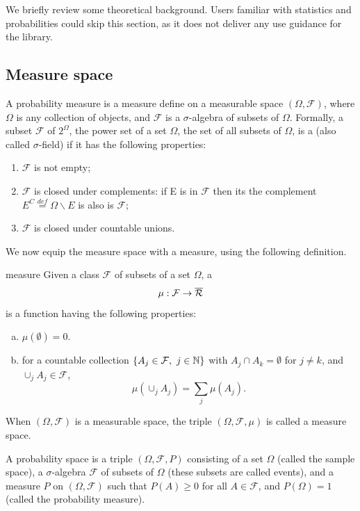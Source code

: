 We briefly review some theoretical background.
Users familiar with statistics and probabilities could skip this section, as it does not deliver any use guidance for the library.

\subsection{Measure space}

A probability measure is a measure define on a measurable space $(\Omega, \mathcal{F})$,
where $\Omega$ is any collection of objects, and $\mathcal{F}$ is a $\sigma$-algebra of subsets of $\Omega$.
Formally, a subset $\mathcal{F}$ of $2^{\Omega}$, the power set
of a set ${\Omega}$, the set of all subsets of ${\Omega}$, is a
 (also called $\sigma$-field) if it has the
following properties:
\begin{enumerate}
\item
$\mathcal{F}$ is not empty;
\item
$\mathcal{F}$ is closed under complements: if E is in $\mathcal{F}$ then its
the complement $E^C \overset{def}{=} {\Omega} \backslash E$ is also is $\mathcal{F}$;
\item
$\mathcal{F}$ is closed under countable unions.
\end{enumerate}
We now equip the measure space with a measure, using the following definition.
\begin{defn}{measure}
Given a class $\mathcal{F}$ of subsets of a set $\Omega$, a 
\[
 \mu: \mathcal{F} \rightarrow \overline{\mathcal{R}}
\]
is a function having the following properties:
\begin{enumerate}[(a)]
 \item $\mu(\emptyset) = 0$.
 \item for a countable collection $\lbrace A_j \in \mathcal{F},\ j \in \mathbb{N} \rbrace$ with $A_j \cap A_k = \emptyset$
  for $j \ne k$, and $\cup_j A_j \in \mathcal{F}$,
\[
 \mu \left( \cup_j A_j \right) = \sum_j \mu(A_j). 
\]
\end{enumerate}
\end{defn}
When $(\Omega, \mathcal{F})$ is a measurable space, the triple $(\Omega, \mathcal{F}, \mu)$ is called a measure space.

A probability space is a triple $(\Omega,
\mathcal{F}, P)$ consisting of a set $\Omega$ (called the sample space), a $\sigma$-algebra
$\mathcal{F}$ of subsets of $\Omega$ (these subsets are called
events), and a measure $P$ on $(\Omega, \mathcal{F})$ such that
$P(A) \geq 0$ for all $A \in \mathcal{F}$, and
$P(\Omega)=1$ (called the probability measure).

